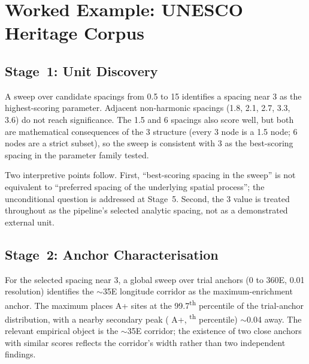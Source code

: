 \documentclass[12pt,a4paper]{article}
\newcommand{\degr}{\ifmmode{^\circ}\else\textdegree{}\fi}
\newcommand{\anchorMaxAp}{\GerizimSweepAp}           %
\newcommand{\anchorAltAp}{\JerusalemSweepAp}         %
\newcommand{\anchorAltPctile}{\JerusalemSweepPctile} %
\begin{document}

\section{Worked Example: UNESCO Heritage Corpus}
\label{sec:worked_example}

\subsection{Stage~1: Unit Discovery}

A sweep over candidate spacings from 0.5\degr{} to 15\degr{} identifies
a spacing near 3\degr{} as the highest-scoring parameter. Adjacent
non-harmonic spacings (1.8\degr{}, 2.1\degr{}, 2.7\degr{}, 3.3\degr{},
3.6\degr{}) do not reach significance. The 1.5\degr{} and 6\degr{}
spacings also score well, but both are mathematical consequences of the
3\degr{} structure (every 3\degr{} node is a 1.5\degr{} node; 6\degr{}
nodes are a strict subset), so the sweep is consistent with 3\degr{}
as the best-scoring spacing in the parameter family tested.

Two interpretive points follow. First, ``best-scoring spacing in the
sweep'' is not equivalent to ``preferred spacing of the underlying
spatial process''; the unconditional question is addressed at Stage~5.
Second, the 3\degr{} value is treated throughout as the pipeline's
selected analytic spacing, not as a demonstrated external unit.

\subsection{Stage~2: Anchor Characterisation}

For the selected spacing near 3\degr{}, a global sweep over
\anchorSweepNanchors{} trial anchors (0\degr{} to 360\degr{}E,
0.01\degr{} resolution) identifies the $\sim$35\degr{}E longitude
corridor as the maximum-enrichment anchor. The maximum places
\anchorMaxAp{} A+ sites at the 99.7\textsuperscript{th} percentile of
the trial-anchor distribution, with a nearby secondary peak
(\anchorAltAp{} A+, \anchorAltPctile\textsuperscript{th} percentile)
$\sim$0.04\degr{} away. The relevant empirical object is the
$\sim$35\degr{}E corridor; the existence of two close anchors with
similar scores reflects the corridor's width rather than two
independent findings.
\end{document}
